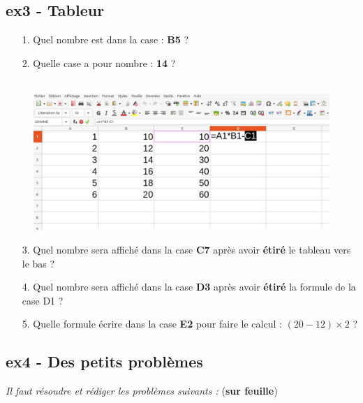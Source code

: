 \begin{minipage}[t]{0.45\textwidth}
  \subsection*{ex3 - Tableur}

  \begin{enumerate}
    \item[1.] Quel nombre est dans la case : \textbf{B5} ? \dotfill
    \item[2.] Quelle case a pour nombre : \textbf{14} ? \dotfill
  \end{enumerate}

\end{minipage}
\begin{minipage}[t]{0.5\textwidth}

  \begin{figure}[H]
        \centering
        \includegraphics[width=\linewidth]{4x2-proportionnalite/ie-tableur.png}
  \end{figure}

\end{minipage}

\begin{enumerate}
  \item[3.] Quel nombre sera affiché dans la case \textbf{C7} après avoir \textbf{étiré} le tableau vers le bas ? \dotfill
  \item[4.] Quel nombre sera affiché dans la case \textbf{D3} après avoir \textbf{étiré} la formule de la case D1 ? \dotfill
  \item[5.] Quelle formule écrire dans la case \textbf{E2} pour faire le calcul : $(20-12) \times 2$ ? \dotfill
\end{enumerate}

\newpage

\subsection*{ex4 - Des petits problèmes}
\textit{Il faut résoudre et rédiger les problèmes suivants :} (\textbf{sur feuille})

